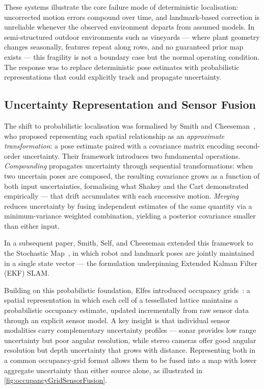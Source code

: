 These systems illustrate the core failure mode of deterministic localisation: uncorrected motion errors compound over time, and landmark-based correction is unreliable whenever the observed environment departs from assumed models. In semi-structured outdoor environments such as vineyards --- where plant geometry changes seasonally, features repeat along rows, and no guaranteed prior map exists --- this fragility is not a boundary case but the normal operating condition. The response was to replace deterministic pose estimates with probabilistic representations that could explicitly track and propagate uncertainty.

\subsection{Uncertainty Representation and Sensor Fusion}
\label{subsec:uncertainty-sensor-fusion}

The shift to probabilistic localisation was formalised by Smith and Cheeseman~\cite{smithRepresentationEstimationSpatial1987}, who proposed representing each spatial relationship as an \textit{approximate transformation}: a pose estimate paired with a covariance matrix encoding second-order uncertainty. Their framework introduces two fundamental operations. \textit{Compounding} propagates uncertainty through sequential transformations: when two uncertain poses are composed, the resulting covariance grows as a function of both input uncertainties, formalising what Shakey and the Cart demonstrated empirically --- that drift accumulates with each successive motion. \textit{Merging} reduces uncertainty by fusing independent estimates of the same quantity via a minimum-variance weighted combination, yielding a posterior covariance smaller than either input.

In a subsequent paper, Smith, Self, and Cheeseman extended this framework to the Stochastic Map~\cite{smithEstimatingUncertainSpatial2013}, in which robot and landmark poses are jointly maintained in a single state vector --- the formulation underpinning Extended Kalman Filter (EKF) SLAM.

Building on this probabilistic foundation, Elfes introduced occupancy grids~\cite{elfesUsingOccupancyGrids1989}: a spatial representation in which each cell of a tessellated lattice maintains a probabilistic occupancy estimate, updated incrementally from raw sensor data through an explicit sensor model. A key insight is that individual sensor modalities carry complementary uncertainty profiles --- sonar provides low range uncertainty but poor angular resolution, while stereo cameras offer good angular resolution but depth uncertainty that grows with distance. Representing both in a common occupancy-grid format allows them to be fused into a map with lower aggregate uncertainty than either source alone, as illustrated in \cref{fig:occupancyGridSensorFusion}.


